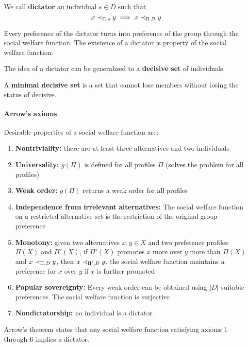 We call \textbf{dictator} an individual $s \in D$ such that 
$$ x \prec_{\Pi, s} y \implies x \prec_{\Pi, D} y$$

Every preference of the dictator turns into preference of the group through the social welfare function. The existence of a dictator is property of the social welfare function.

The idea of a dictator can be generalized to a \textbf{decisive set} of individuals.

A \textbf{minimal decisive set} is a set that cannot lose members without losing the status of decisive.

\paragraph{Arrow's axioms} Desirable properties of a social welfare function are: 
\begin{enumerate}
	\item \textbf{Nontriviality:} there are at least three alternatives and two individuals 
	
	\item \textbf{Universality:} $g(\Pi)$ is defined for all profiles $\Pi$ (solves the problem for all profiles)
	
	\item \textbf{Weak order:} $g(\Pi)$ returns a weak order for all profiles
	
	\item \textbf{Independence from irrelevant alternatives:} The social welfare function on a restricted alternative set is the restriction of the original group preference
	
	\item \textbf{Monotony:} given two alternatives $x,y \in X$ and two preference profiles $\Pi(X)$ and $\Pi'(X)$, if $\Pi'(X)$ promotes $x$ more over $y$ more than $\Pi(X)$ and $x \prec_{\Pi, D} y$, then $x \prec_{\Pi', D} y$, the social welfare function maintains a preference for $x$ over $y$ if $x$ is further promoted
	
	\item \textbf{Popular sovereignty:} Every weak order can be obtained using $|D|$ suitable preferences. The social welfare function is surjective
	
	\item \textbf{Nondictatorship:} no individual is a dictator
\end{enumerate}

Arrow's theorem states that any social welfare function satisfying axioms 1 through 6 implies a dictator.

